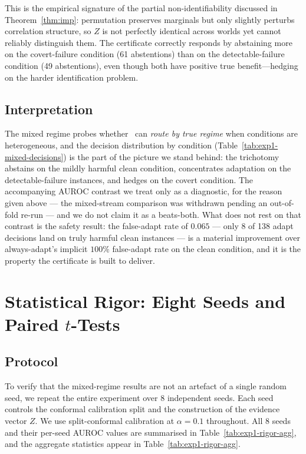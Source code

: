 This is the empirical signature of the partial non-identifiability discussed in
Theorem~\ref{thm:imp}: permutation preserves marginals but only slightly perturbs
correlation structure, so $Z$ is not perfectly identical across worlds yet cannot
reliably distinguish them.  The certificate correctly responds by abstaining more on
the covert-failure condition (61 abstentions) than on the detectable-failure condition
(49 abstentions), even though both have positive true benefit---hedging on the harder
identification problem.

\subsection{Interpretation}

The mixed regime probes whether \KGA\ can \emph{route by true regime} when conditions are
heterogeneous, and the decision distribution by condition (Table~\ref{tab:exp1-mixed-decisions})
is the part of the picture we stand behind: the trichotomy abstains on the mildly harmful
clean condition, concentrates adaptation on the detectable-failure instances, and hedges
on the covert condition.  The accompanying AUROC contrast we treat only as a diagnostic,
for the reason given above --- the mixed-stream comparison was withdrawn pending an
out-of-fold re-run --- and we do not claim it as a beats-both.  What does not rest on that
contrast is the safety result: the false-adapt rate of $0.065$ --- only $8$ of 138 adapt
decisions land on truly harmful clean instances --- is a material improvement over
always-adapt's implicit $100\%$ false-adapt rate on the clean condition, and it is the
property the certificate is built to deliver.

\section{Statistical Rigor: Eight Seeds and Paired $t$-Tests}
\label{sec:exp1-rigor}

\subsection{Protocol}

To verify that the mixed-regime results are not an artefact of a single random seed, we
repeat the entire experiment over 8 independent seeds.  Each seed controls the
conformal calibration split and the construction of the evidence vector $Z$.
We use split-conformal calibration at $\alpha = 0.1$ throughout.  All 8 seeds and
their per-seed AUROC values are summarised in Table~\ref{tab:exp1-rigor-agg}, and the
aggregate statistics appear in Table~\ref{tab:exp1-rigor-agg}.

